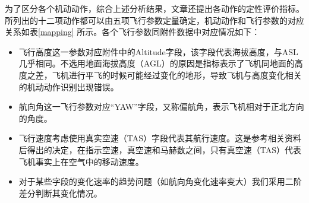 \documentclass{my_paper}
\begin{document}
为了区分各个机动动作，综合上述分析结果，文章还提出各动作的定性评价指标。所列出的十二项动作都可以由五项飞行参数定量确定，机动动作和飞行参数的对应关系如表\ref{mapping} 所示。各个飞行参数同附件数据中对应情况如下：
\begin{itemize}
    \item 飞行高度这一参数对应附件中的Altitude字段，该字段代表海拔高度，与ASL几乎相同。不选用地面海拔高度（AGL）的原因是指标表示了飞机同地面的高度之差，飞机进行平飞的时候可能经过变化的地形，导致飞机与高度变化相关的机动动作识别出现错误。
    \item 航向角这一飞行参数对应“YAW”字段，又称偏航角，表示飞机相对于正北方向的角度。
    \item 飞行速度考虑使用真实空速（TAS）字段代表其航行速度。这是参考相关资料\cite{8}后得出的决定，在指示空速，真空速和马赫数之间，只有真空速（TAS）代表飞机事实上在空气中的移动速度。
    \item 对于某些字段的变化速率的趋势问题（如航向角变化速率变大）我们采用二阶差分判断其变化情况。

\end{itemize}
\end{document}
